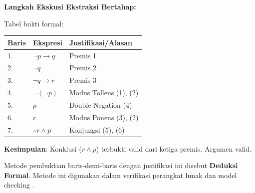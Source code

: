 \textbf{Langkah Ekskusi Ekstraksi Bertahap:}

Tabel bukti formal:
\begin{table}[htbp]
\centering
\small
\begin{tabular}{|p{0.9cm}|p{3.2cm}|p{6.8cm}|}
\hline
\textbf{Baris} & \textbf{Ekspresi} & \textbf{Justifikasi/Alasan} \\
\hline
1. & $\neg p \rightarrow q$ & Premis 1 \\
2. & $\neg q$                 & Premis 2 \\
3. & $\neg q \rightarrow r$   & Premis 3 \\
\hline
4. & $\neg (\neg p)$          & Modus Tollens (1), (2) \\
5. & $p$                      & Double Negation (4) \\
6. & $r$                      & Modus Ponens (3), (2) \\
\hline
7. & \textbf{$\therefore r \land p$} & Konjungsi (5), (6) \\
\hline
\end{tabular}
\end{table}

\textbf{Kesimpulan}: Konklusi ($r \land p$) terbukti valid dari ketiga premis. Argumen valid.

Metode pembuktian baris-demi-baris dengan justifikasi ini disebut \textbf{Deduksi Formal}. Metode ini digunakan dalam verifikasi perangkat lunak dan model checking \cite{wiki_first_order_logic}.
